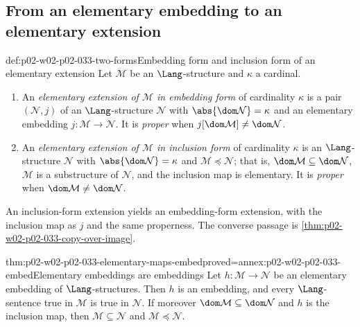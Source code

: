\subsection{From an elementary embedding to an elementary extension}
\label{sec:p02-w02-p02-033-inclusion}

\begin{hbdefinition}{def:p02-w02-p02-033-two-forms}{Embedding form and inclusion form of an elementary extension}
Let \(\mathcal M\) be an \(\Lang\)-structure and \(\kappa\) a cardinal.
\begin{enumerate}
  \item An \emph{elementary extension of \(\mathcal M\) in embedding form} of
        cardinality \(\kappa\) is a pair \((\mathcal N,j)\) of an
        \(\Lang\)-structure \(\mathcal N\) with
        \(\abs{\dom\mathcal N}=\kappa\) and an elementary embedding
        \(j:\mathcal M\to\mathcal N\).  It is \emph{proper} when
        \(j[\dom\mathcal M]\ne\dom\mathcal N\).
  \item An \emph{elementary extension of \(\mathcal M\) in inclusion form}
        of cardinality \(\kappa\) is an \(\Lang\)-structure \(\mathcal N\)
        with \(\abs{\dom\mathcal N}=\kappa\) and
        \(\mathcal M\preccurlyeq\mathcal N\); that is,
        \(\dom\mathcal M\subseteq\dom\mathcal N\), \(\mathcal M\) is a
        substructure of \(\mathcal N\), and the inclusion map is elementary.
        It is \emph{proper} when \(\dom\mathcal M\ne\dom\mathcal N\).
\end{enumerate}
An inclusion-form extension yields an embedding-form extension, with the
inclusion map as \(j\) and the same properness.  The converse passage is
\cref{thm:p02-w02-p02-033-copy-over-image}.
\end{hbdefinition}

\begin{hblemma}{thm:p02-w02-p02-033-elementary-maps-embed}{proved=annex:p02-w02-p02-033-embed}{Elementary embeddings are embeddings}
Let \(h:\mathcal M\to\mathcal N\) be an elementary embedding of
\(\Lang\)-structures.  Then \(h\) is an embedding, and every
\(\Lang\)-sentence true in \(\mathcal M\) is true in \(\mathcal N\).  If
moreover \(\dom\mathcal M\subseteq\dom\mathcal N\) and \(h\) is the
inclusion map, then \(\mathcal M\subseteq\mathcal N\) and
\(\mathcal M\preccurlyeq\mathcal N\).
\end{hblemma}

